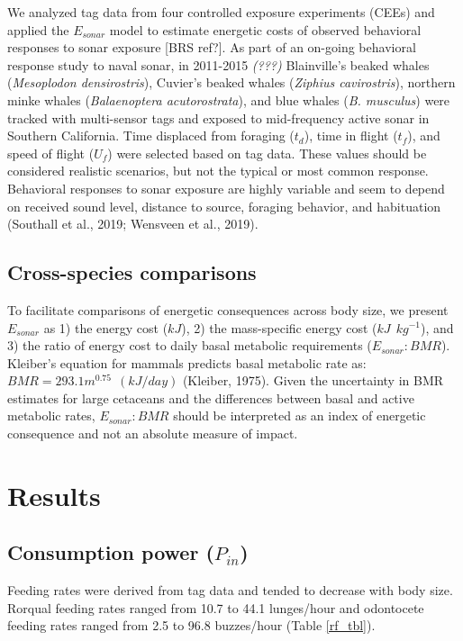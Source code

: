 \documentclass[]{elsarticle} %
\begin{document}
We analyzed tag data from four controlled exposure experiments (CEEs)
and applied the \(E_{sonar}\) model to estimate energetic costs of
observed behavioral responses to sonar exposure {[}BRS ref?{]}. As part
of an on-going behavioral response study to naval sonar, in 2011-2015
\emph{(???)} Blainville's beaked whales (\emph{Mesoplodon
densirostris}), Cuvier's beaked whales (\emph{Ziphius cavirostris}),
northern minke whales (\emph{Balaenoptera acutorostrata}), and blue
whales (\emph{B. musculus}) were tracked with multi-sensor tags and
exposed to mid-frequency active sonar in Southern California. Time
displaced from foraging (\(t_d\)), time in flight (\(t_f\)), and speed
of flight (\(U_f\)) were selected based on tag data. These values should
be considered realistic scenarios, but not the typical or most common
response. Behavioral responses to sonar exposure are highly variable and
seem to depend on received sound level, distance to source, foraging
behavior, and habituation (Southall et al., 2019; Wensveen et al.,
2019).

\subsection{Cross-species comparisons}\label{cross-species-comparisons}

To facilitate comparisons of energetic consequences across body size, we
present \(E_{sonar}\) as 1) the energy cost (\(kJ\)), 2) the
mass-specific energy cost (\(kJ ~~ kg^{-1}\)), and 3) the ratio of
energy cost to daily basal metabolic requirements (\(E_{sonar}:BMR\)).
Kleiber's equation for mammals predicts basal metabolic rate as:
\(BMR = 293.1 m^{0.75} ~~ (kJ/day)\) (Kleiber, 1975). Given the
uncertainty in BMR estimates for large cetaceans and the differences
between basal and active metabolic rates, \(E_{sonar}:BMR\) should be
interpreted as an index of energetic consequence and not an absolute
measure of impact.

\section{Results}\label{results}

\subsection{\texorpdfstring{Consumption power
(\(P_{in}\))}{Consumption power (P\_\{in\})}}\label{consumption-power-p_in-1}

Feeding rates were derived from tag data and tended to decrease with
body size. Rorqual feeding rates ranged from 10.7 to 44.1 lunges/hour
and odontocete feeding rates ranged from 2.5 to 96.8 buzzes/hour (Table
\ref{rf_tbl}).
\end{document}
